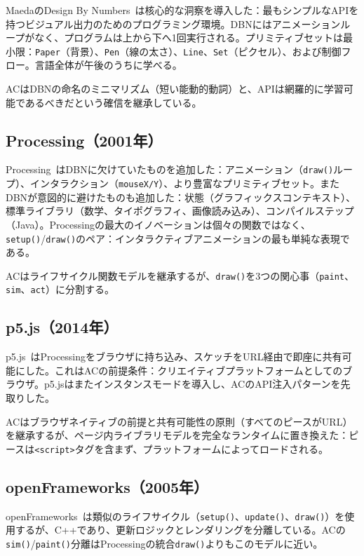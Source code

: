 \documentclass[10pt,letterpaper,twocolumn]{article}
\begin{document}
MaedaのDesign By Numbers~\citep{maeda2001dbn}は核心的な洞察を導入した：最もシンプルなAPIを持つビジュアル出力のためのプログラミング環境。DBNにはアニメーションループがなく、プログラムは上から下へ1回実行される。プリミティブセットは最小限：\texttt{Paper}（背景）、\texttt{Pen}（線の太さ）、\texttt{Line}、\texttt{Set}（ピクセル）、および制御フロー。言語全体が午後のうちに学べる。

ACはDBNの命名のミニマリズム（短い能動的動詞）と、APIは網羅的に学習可能であるべきだという確信を継承している。

\subsection{Processing（2001年）}

Processing~\citep{reas2003processing}はDBNに欠けていたものを追加した：アニメーション（\texttt{draw()}ループ）、インタラクション（\texttt{mouseX/Y}）、より豊富なプリミティブセット。またDBNが意図的に避けたものも追加した：状態（グラフィックスコンテキスト）、標準ライブラリ（数学、タイポグラフィ、画像読み込み）、コンパイルステップ（Java）。Processingの最大のイノベーションは個々の関数ではなく、\texttt{setup()}/\texttt{draw()}のペア：インタラクティブアニメーションの最も単純な表現である。

ACはライフサイクル関数モデルを継承するが、\texttt{draw()}を3つの関心事（\texttt{paint}、\texttt{sim}、\texttt{act}）に分割する。

\subsection{p5.js（2014年）}

p5.js~\citep{mccarthy2015p5js}はProcessingをブラウザに持ち込み、スケッチをURL経由で即座に共有可能にした。これはACの前提条件：クリエイティブプラットフォームとしてのブラウザ。p5.jsはまたインスタンスモードを導入し、ACのAPI注入パターンを先取りした。

ACはブラウザネイティブの前提と共有可能性の原則（すべてのピースがURL）を継承するが、ページ内ライブラリモデルを完全なランタイムに置き換えた：ピースは\texttt{<script>}タグを含まず、プラットフォームによってロードされる。

\subsection{openFrameworks（2005年）}

openFrameworks~\citep{openframeworks2005}は類似のライフサイクル（\texttt{setup()}、\texttt{update()}、\texttt{draw()}）を使用するが、C++であり、更新ロジックとレンダリングを分離している。ACの\texttt{sim()}/\texttt{paint()}分離はProcessingの統合\texttt{draw()}よりもこのモデルに近い。
\end{document}
